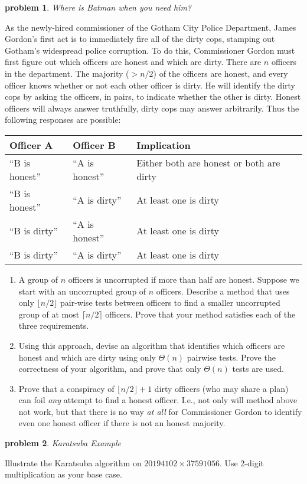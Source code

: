 \documentclass[12pt]{extarticle}
\newtheorem{problem}{\sc\color{cit}problem}
\begin{document}
\begin{problem} Where is Batman when you need him? \end{problem}
As the newly-hired commissioner of the Gotham City Police Department, James Gordon's first act is to immediately fire all of the dirty cops, stamping out Gotham's widespread police corruption. To do this, Commissioner Gordon must first figure out which officers are honest and which are dirty. There are $n$ officers in the department. The majority ($> n/2$) of the officers are honest, and every officer knows whether or not each other officer is dirty. He will identify the dirty cops by asking the officers, in pairs, to indicate whether the other is dirty. Honest officers will always answer truthfully, dirty cops may answer arbitrarily. Thus the following responses are possible:

\begin{tabular}{lll}
Officer A & Officer B & Implication \\
\hline
``B is honest'' & ``A is honest'' & Either both are honest or both are dirty \\
``B is honest'' & ``A is dirty'' & At least one is dirty \\
``B is dirty'' & ``A is honest'' & At least one is dirty \\
``B is dirty'' & ``A is dirty'' & At least one is dirty
\end{tabular}

\begin{enumerate}
    \item A group of $n$ officers is uncorrupted if more than half are honest. Suppose we start with an uncorrupted group of $n$ officers. Describe a method that uses only $\lfloor n/2 \rfloor$ pair-wise tests between officers to find a smaller uncorrupted group of at most $\lceil n/2 \rceil$ officers. Prove that your method satisfies each of the three requirements.
    
    \item Using this approach, devise an algorithm that identifies which officers are honest and which are dirty using only $\Theta(n)$ pairwise tests. Prove the correctness of your algorithm, and prove that only $\Theta(n)$ tests are used.
    
    \item Prove that a conspiracy of $\lfloor n/2 \rfloor + 1$ dirty officers (who may share a plan) can foil \emph{any} attempt to find a honest officer. I.e., not only will method above not work, but that there is no way \emph{at all} for Commissioner Gordon to identify even one honest officer if there is not an honest majority.

\end{enumerate}

\begin{problem} Karatsuba Example \end{problem}
Illustrate the Karatsuba algorithm on $20194102 \times 37591056$. Use 2-digit multiplication as your base case.
\end{document}
